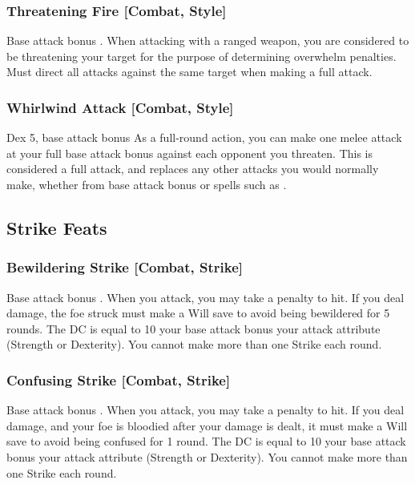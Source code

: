 \subsubsection{Threatening Fire [Combat, Style]}
 Base attack bonus .
 When attacking with a ranged weapon, you are considered to be threatening your target for the purpose of determining overwhelm penalties.
 Must direct all attacks against the same target when making a full attack.

\subsubsection{Whirlwind Attack [Combat, Style]}
 Dex 5, base attack bonus 
 As a full-round action, you can make one melee attack at your full base attack bonus against each opponent you threaten. This is considered a full attack, and replaces any other attacks you would normally make, whether from base attack bonus or spells such as .

\subsection{Strike Feats}

\subsubsection{Bewildering Strike [Combat, Strike]}
\featpre Base attack bonus .
\featben When you attack, you may take a  penalty to hit. If you deal damage, the foe struck must make a Will save to avoid being bewildered for 5 rounds. The DC is equal to 10 \add your base attack bonus \add your attack attribute (Strength or Dexterity). You cannot make more than one Strike each round.

\subsubsection{Confusing Strike [Combat, Strike]}
\featpre Base attack bonus .
\featben When you attack, you may take a  penalty to hit. If you deal damage, and your foe is bloodied after your damage is dealt, it must make a Will save to avoid being confused for 1 round. The DC is equal to 10 \add your base attack bonus \add your attack attribute (Strength or Dexterity). You cannot make more than one Strike each round.

